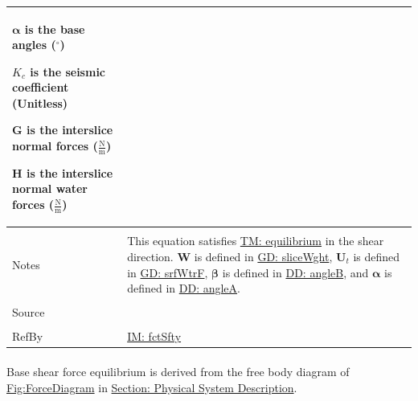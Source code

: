 \documentclass[12pt]{article}
\begin{document}
\begin{minipage}{\textwidth}
\begin{tabular}{>{\raggedright}p{}>{\raggedright\arraybackslash}p{}}
\begin{symbDescription}
                        \item{$\mathbf{α}$ is the base angles (${}^{\circ}$)}
                        \item{${K_{c}}$ is the seismic coefficient (Unitless)}
                        \item{$\mathbf{G}$ is the interslice normal forces ($\frac{\text{N}}{\text{m}}$)}
                        \item{$\mathbf{H}$ is the interslice normal water forces ($\frac{\text{N}}{\text{m}}$)}
                        \end{symbDescription}
          \\ \midrule \\
          Notes & This equation satisfies \hyperref[TM:equilibrium]{TM: equilibrium} in the shear direction. $\mathbf{W}$ is defined in \hyperref[GD:sliceWght]{GD: sliceWght}, ${\mathbf{U}_{t}}$ is defined in \hyperref[GD:srfWtrF]{GD: srfWtrF}, $\mathbf{β}$ is defined in \hyperref[DD:angleB]{DD: angleB}, and $\mathbf{α}$ is defined in \hyperref[DD:angleA]{DD: angleA}.
          \\ \midrule \\
          Source & \cite{chen2005}
          \\ \midrule \\
          RefBy & \hyperref[IM:fctSfty]{IM: fctSfty}
          \\ \bottomrule
          \end{tabular}
          \end{minipage}
\paragraph{}
\label{GD:bsShrFEqDeriv}
Base shear force equilibrium is derived from the free body diagram of \hyperref[Figure:ForceDiagram]{Fig:ForceDiagram} in \hyperref[Sec:PhysSyst]{Section: Physical System Description}.
\par~
\end{document}
